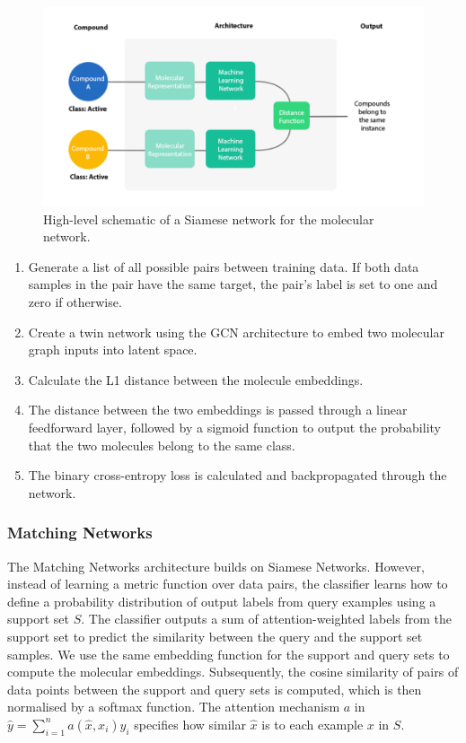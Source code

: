 \documentclass[journal=jcisd8,manuscript=article]{achemso} %
\begin{document}
\begin{figure}[h]
    \centering
    \includegraphics[width=0.9\linewidth]{img/high-level siamese.png}
    \caption[High-level schematic of Siamese network]{High-level schematic of a Siamese network for the molecular network.}
    \label{fig:siamesenetarchi}
\end{figure}

\begin{enumerate}
    \item Generate a list of all possible pairs between training data. If both data samples in the pair have the same target, the pair's label is set to one and zero if otherwise.
    \item Create a twin network using the GCN architecture to embed two molecular graph inputs into latent space.
    \item Calculate the L1 distance between the molecule embeddings. 
    \item The distance between the two embeddings is passed through a linear feedforward layer, followed by a sigmoid function to output the probability that the two molecules belong to the same class.
    \item The binary cross-entropy loss is calculated and backpropagated through the network.
\end{enumerate}

\subsubsection{Matching Networks}

The Matching Networks architecture builds on Siamese Networks. However, instead of learning a metric function over data pairs, the classifier learns how to define a probability distribution of output labels from query examples using a support set $S$. The classifier outputs a sum of attention-weighted labels from the support set to predict the similarity between the query and the support set samples. We use the same embedding function for the support and query sets to compute the molecular embeddings. Subsequently, the cosine similarity of pairs of data points between the support and query sets is computed, which is then normalised by a softmax function. The attention mechanism $a$ in $\hat{y} = \sum_{i=1}^{n} a(\hat{x}, x_i)y_i$ specifies how similar $\hat{x}$ is to each example $x$ in $S$.
\end{document}
